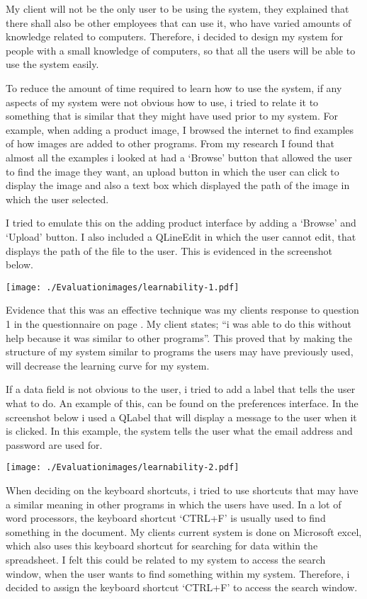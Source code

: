 My client will not be the only user to be using the system, they explained that there shall also be other employees that can use it, who have varied amounts of knowledge related to computers. Therefore, i decided to design my system for people with a small knowledge of computers, so that all the users will be able to use the system easily.

To reduce the amount of time required to learn how to use the system, if any aspects of my system were not obvious how to use, i tried to relate it to something that is similar that they might have used prior to my system. For example, when adding a product image, I browsed the internet to find examples of how images are added to other programs. From my research I found that almost all the examples i looked at had a `Browse' button that allowed the user to find the image they want, an upload button in which the user can click to display the image and also a text box which displayed the path of the image in which the user selected. 

I tried to emulate this on the adding product interface by adding a `Browse' and `Upload' button. I also included a QLineEdit in which the user cannot edit, that displays the path of the file to the user. This is evidenced in the screenshot below.

\texttt{[image: ./Evaluationimages/learnability-1.pdf]}

Evidence that this was an effective technique was my clients response to question 1 in the questionnaire on page \pageref{Client-Q1}. My client states; ``i was able to do this without help because it was similar to other programs''. This proved that by making the structure of my system similar to programs the users may have previously used, will decrease the learning curve for my system.

If a data field is not obvious to the user, i tried to add a label that tells the user what to do. An example of this, can be found on the preferences interface.
In the screenshot below i used a QLabel that will display a message to the user when it is clicked. In this example, the system tells the user what the email address and password are used for.

\texttt{[image: ./Evaluationimages/learnability-2.pdf]}

When deciding on the keyboard shortcuts, i tried to use shortcuts that may have a similar meaning in other programs in which the users have used. In a lot of word processors, the keyboard shortcut `CTRL+F' is usually used to find something in the document. My clients current system is done on Microsoft excel, which also uses this keyboard shortcut for searching for data within the spreadsheet. I felt this could be related to my system to access the search window, when the user wants to find something within my system. Therefore, i decided to assign the keyboard shortcut `CTRL+F' to access the search window.

